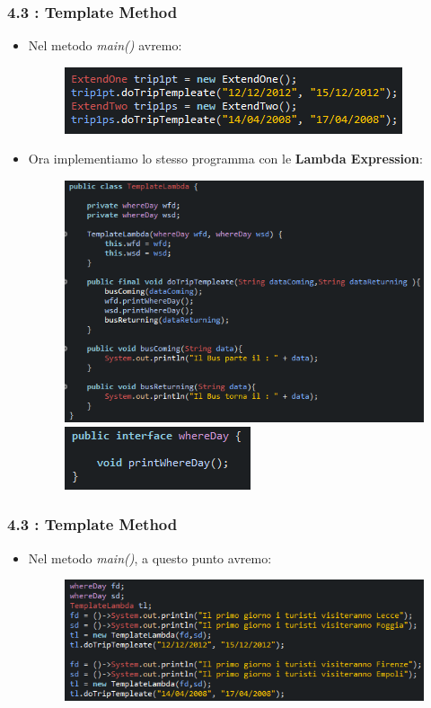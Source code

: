 \documentclass{beamer}
\begin{document}

\begin{frame}
	\frametitle{\textbf{4.3 : Template Method}}
	\begin{itemize}
		\item
			Nel metodo \textit{main()} avremo:
			\begin{figure}
				\centering
				\includegraphics[width=0.6\linewidth]{image/mainTemplate.png}
				\label{fig:target}
			\end{figure}
		\item
			Ora implementiamo lo stesso programma con le \textbf{Lambda Expression}:
			\begin{figure}
				\centering
				\includegraphics[width=0.6\linewidth]{image/templateLambda.png}
				\label{fig:target}
				\centering
				\includegraphics[width=0.3\linewidth]{image/interfaceTemplateLambda.png}
				\label{fig:target}
			\end{figure}
	\end{itemize}
\end{frame}


\begin{frame}
	\frametitle{\textbf{4.3 : Template Method}}
	\begin{itemize}
		\item
			Nel metodo \textit{main()}, a questo punto avremo:
			\begin{figure}
				\centering
				\includegraphics[width=0.9\linewidth]{image/mainTemplateLambda.png}
				\label{fig:target}
			\end{figure}
	\end{itemize}
\end{frame}
\end{document}
